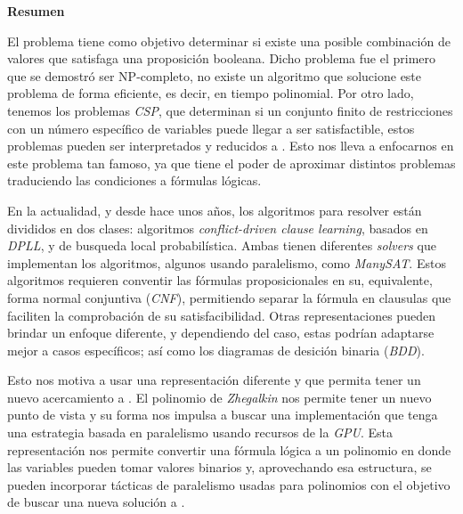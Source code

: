 \cleardoublepage
{}
{}
\thispagestyle{pagebottom}
\noindent\textbf{\Huge Resumen}

\vspace{2em}

El problema \sat tiene como objetivo determinar si existe una posible combinación de valores que satisfaga una proposición booleana. Dicho problema fue el primero que se demostró ser NP-completo, no existe un algoritmo que solucione este problema de forma eficiente, es decir, en tiempo polinomial. Por otro lado, tenemos los problemas \textit{CSP}, que determinan si un conjunto finito de restricciones con un número específico de variables puede llegar a ser satisfactible, estos problemas pueden ser interpretados y reducidos a \sat. Esto nos lleva a enfocarnos en este problema tan famoso, ya que tiene el poder de aproximar distintos problemas traduciendo las condiciones a fórmulas lógicas.

En la actualidad, y desde hace unos años, los algoritmos para resolver \sat están divididos en dos clases: algoritmos \textit{conflict-driven clause learning}, basados en \textit{DPLL}, y de busqueda local probabilística. Ambas tienen diferentes \textit{solvers} que implementan los algoritmos, algunos usando paralelismo, como \textit{ManySAT}. Estos algoritmos requieren conventir las fórmulas proposicionales en su, equivalente, forma normal conjuntiva (\textit{CNF}), permitiendo separar la fórmula en clausulas que faciliten la comprobación de su satisfacibilidad. Otras representaciones pueden brindar un enfoque diferente, y dependiendo del caso, estas podrían adaptarse mejor a casos específicos; así como los diagramas de desición binaria (\textit{BDD}).

Esto nos motiva a usar una representación diferente y que permita tener un nuevo acercamiento a \sat. El polinomio de \textit{Zhegalkin} nos permite tener un nuevo punto de vista y su forma nos impulsa a buscar una implementación que tenga una estrategia basada en paralelismo usando recursos de la \textit{GPU}. Esta representación nos permite convertir una fórmula lógica a un polinomio en donde las variables pueden tomar valores binarios y, aprovechando esa estructura, se pueden incorporar tácticas de paralelismo usadas para polinomios con el objetivo de buscar una nueva solución a \sat.

\newpage